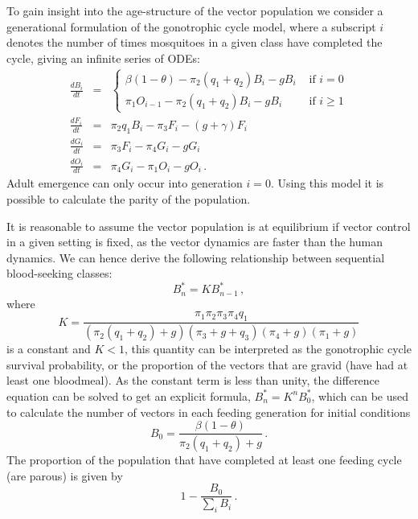 To gain insight into the age-structure of the vector population we consider a generational formulation of the gonotrophic cycle model, where a subscript $i$ denotes the number of times mosquitoes in a given class have completed the cycle, giving an infinite series of ODEs:
\begin{eqnarray}
\frac{dB_i}{dt} &=& \begin{cases}  \beta(1-\theta) - \pi_2(q_1+q_2)B_{i} -gB_{i} &\mbox{ if } i=0\\ \pi_1O_{i-1} - \pi_2(q_1+q_2)B_{i} -gB_{i} &\mbox{ if } i\geq 1
\end{cases}\\
\frac{dF_i}{dt} &=& \pi_2q_1B_i - \pi_3 F_i - (g+\gamma) F_i \\
\frac{dG_i}{dt} &=& \pi_3F_i - \pi_4G_i - g G_i \\
\frac{dO_i}{dt} &=& \pi_4G_i - \pi_1O_i - g O_i \,.
\label{eqn:dist}
\end{eqnarray}
Adult emergence can only occur into generation $i=0$. Using this model it is possible to calculate the parity of the population.

It is reasonable to assume the vector population is at equilibrium if vector control in a given setting is fixed, as the vector dynamics are faster than the human dynamics. We can hence derive the following relationship between sequential blood-seeking classes:
\begin{equation}
B_n^* = KB_{n-1}^*\,,
\end{equation}
where
\begin{equation}
K = \frac{\pi_1\pi_2\pi_3\pi_4q_1}{(\pi_2(q_1+q_2)+g)(\pi_3+g+q_3)(\pi_4+g)(\pi_1+g)}
\end{equation}
is a constant and $K<1$, this quantity can be interpreted as the gonotrophic cycle survival probability, or the proportion of the vectors that are gravid (have had at least one bloodmeal). As the constant term is less than unity, the difference equation can be solved to get an explicit formula, $B_n^* = K^nB_0^*$, which can be used to calculate the number of vectors in each feeding generation for initial conditions
\begin{equation}
B_0 = \frac{\beta(1-\theta)}{\pi_2(q_1+q_2)+g}\,.
\end{equation}
The proportion of the population that have completed at least one feeding cycle (are parous) is given by
\begin{equation}
1-\frac{B_0}{\sum_i B_i}\,.
\end{equation}

